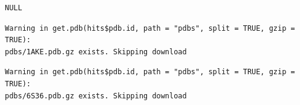 \documentclass[
  letterpaper,
  DIV=11,
  numbers=noendperiod]{scrartcl}
\newenvironment{Shaded}{\begin{snugshade}}{\end{snugshade}}
\newcommand{\AttributeTok}[1]{\textcolor[rgb]{0.40,0.45,0.13}{#1}}
\newcommand{\CommentTok}[1]{\textcolor[rgb]{0.37,0.37,0.37}{#1}}
\newcommand{\ConstantTok}[1]{\textcolor[rgb]{0.56,0.35,0.01}{#1}}
\newcommand{\FunctionTok}[1]{\textcolor[rgb]{0.28,0.35,0.67}{#1}}
\newcommand{\NormalTok}[1]{\textcolor[rgb]{0.00,0.23,0.31}{#1}}
\newcommand{\OtherTok}[1]{\textcolor[rgb]{0.00,0.23,0.31}{#1}}
\newcommand{\SpecialCharTok}[1]{\textcolor[rgb]{0.37,0.37,0.37}{#1}}
\newcommand{\StringTok}[1]{\textcolor[rgb]{0.13,0.47,0.30}{#1}}
\begin{document}
\begin{verbatim}
NULL
\end{verbatim}

\begin{Shaded}
\end{Shaded}

\begin{Shaded}
\end{Shaded}

\begin{verbatim}
Warning in get.pdb(hits$pdb.id, path = "pdbs", split = TRUE, gzip = TRUE):
pdbs/1AKE.pdb.gz exists. Skipping download
\end{verbatim}

\begin{verbatim}
Warning in get.pdb(hits$pdb.id, path = "pdbs", split = TRUE, gzip = TRUE):
pdbs/6S36.pdb.gz exists. Skipping download
\end{verbatim}
\end{document}
